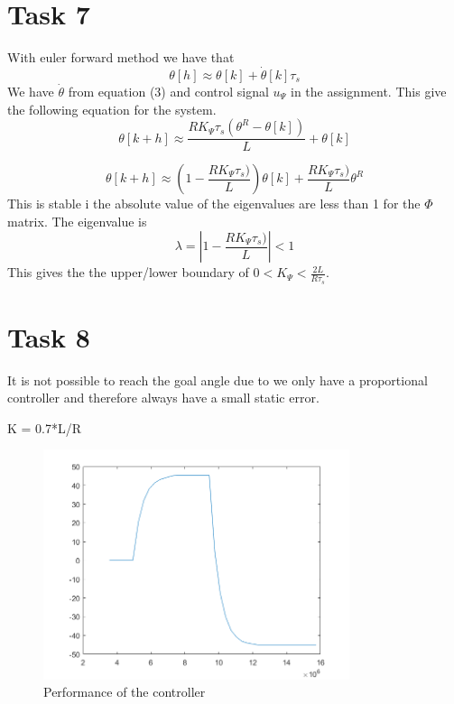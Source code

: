 \documentclass[a4paper,12pt,oneside,onecolumn]{article} %
\begin{document}
\section*{Task 7}

With euler forward method we have that
\begin{equation*}
\theta[h]\approx \theta[k]+\dot{\theta}[k]\tau_s
\end{equation*}
We have $\dot{\theta}$ from equation (3) and control signal $u_\Psi$ in the assignment. This give the following equation for the system.
\begin{equation*}
\theta[k+h]\approx  \frac{R K_\Psi \tau_s(\theta^R-\theta[k])}{L}+\theta[k]
\end{equation*}

\begin{equation*}
\theta[k+h]\approx  (1-\frac{R K_\Psi \tau_s)}{L})\theta[k]+\frac{R K_\Psi \tau_s)}{L}\theta^R
\end{equation*}
This is stable i the absolute value of the eigenvalues are less than 1 for the $\Phi$ matrix. The eigenvalue is
\begin{equation*}
\lambda = |1-\frac{R K_\Psi \tau_s)}{L}|<1
\end{equation*}
This gives the the upper/lower boundary of $0<K_\Psi<\frac{2L}{R\tau_s}$. 

\section*{Task 8}

It is not possible to reach the goal angle due to we only have a proportional controller and therefore always have a small static error.

K = 0.7*L/R
\begin{figure}[H]
\begin{center}	
  \includegraphics[width = 0.8\textwidth]{task8.png}
  \caption{Performance of the controller}
  
 \end{center}
\end{figure}
\end{document}
